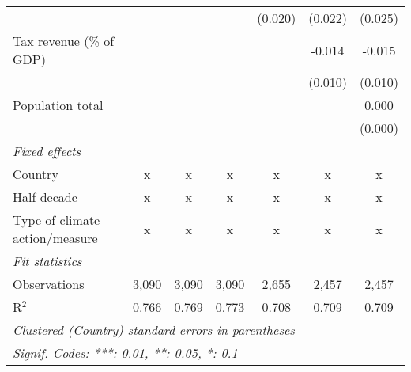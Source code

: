 \begin{tabular}{lcccccc}
                                                                 &         &              &               & (0.020)       & (0.022)       & (0.025)\\   
   Tax revenue (\% of GDP)                                       &         &              &               &               & -0.014        & -0.015\\   
                                                                 &         &              &               &               & (0.010)       & (0.010)\\   
   Population total                                              &         &              &               &               &               & 0.000\\   
                                                                 &         &              &               &               &               & (0.000)\\   
   \emph{Fixed effects}\\
   Country                                                       & x       & x            & x             & x             & x             & x\\  
   Half decade                                                   & x       & x            & x             & x             & x             & x\\  
   Type of climate action/measure                                & x       & x            & x             & x             & x             & x\\  
   \midrule \emph{Fit statistics}\\
   Observations                                                  & 3,090   & 3,090        & 3,090         & 2,655         & 2,457         & 2,457\\  
   R$^2$                                                         & 0.766   & 0.769        & 0.773         & 0.708         & 0.709         & 0.709\\  
   \midrule
   \multicolumn{7}{l}{\emph{Clustered (Country) standard-errors in parentheses}}\\
   \multicolumn{7}{l}{\emph{Signif. Codes: ***: 0.01, **: 0.05, *: 0.1}}\\
\end{tabular}
\par\endgroup



